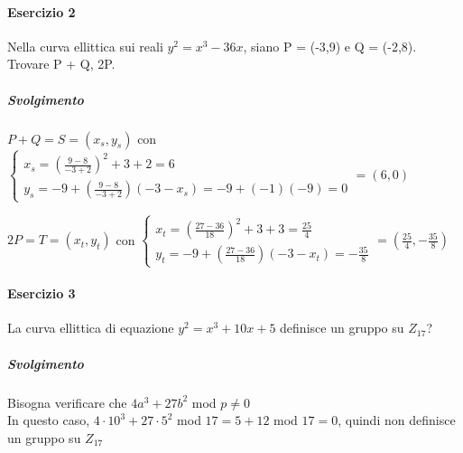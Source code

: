 \documentclass[10pt]{book}
\begin{document}
\paragraph{Esercizio 2} Nella curva ellittica sui reali $y^2 = x^3 - 36x$, siano P = (-3,9) e Q = (-2,8).\\
Trovare P + Q, 2P.
\subparagraph{Svolgimento}\begin{list}{}{Formule a p.48} 
	\item $P + Q = S = (x_s, y_s)$ con $\left\{\begin{array}{l}
		x_s = \left(\frac{9-8}{-3+2}\right)^2 + 3 + 2 = 6\\
		y_s = -9 + \left(\frac{9-8}{-3+2}\right)\left(-3-x_s\right) = -9 + (-1)(-9) = 0
	\end{array}\right. = (6,0)$
	\item $2P = T = (x_t, y_t)$ con $\left\{\begin{array}{l}
	x_t = \left(\frac{27 - 36}{18}\right)^2 + 3 + 3 = \frac{25}{4}\\
	y_t = -9 + \left(\frac{27 - 36}{18}\right)(-3-x_t)= -\frac{35}{8} 
	\end{array}\right. = \left(\frac{25}{4},-\frac{35}{8}\right)
	$
\end{list}
\paragraph{Esercizio 3} La curva ellittica di equazione $y^2 = x^3 + 10x + 5$ definisce un gruppo su $Z_{17}$?
\subparagraph{Svolgimento} Bisogna verificare che $4a^3 + 27b^2$ mod $p \neq 0$\\
In questo caso, $4\cdot10^3 + 27\cdot5^2$ mod $17 = 5+12$ mod $17 = 0$, quindi non definisce un gruppo su $Z_{17}$
\pagebreak
\end{document}

